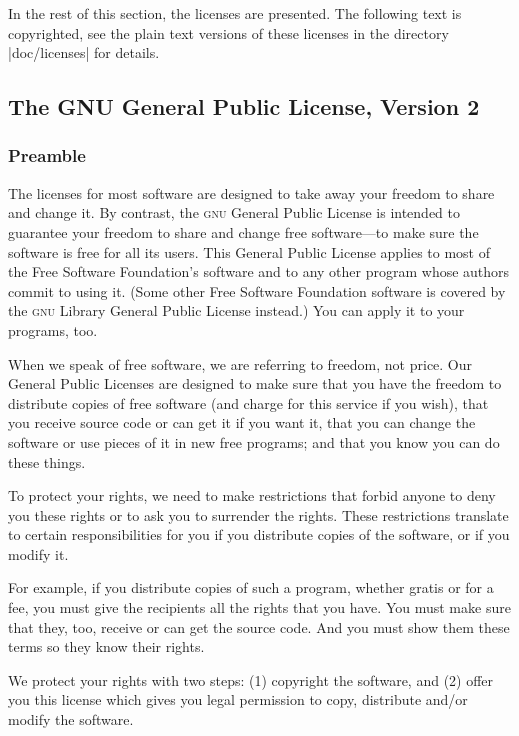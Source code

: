In the rest of this section, the licenses are presented. The following text is copyrighted, see the plain text versions of these licenses in the directory |doc/licenses| for details.


\subsection{The GNU General Public License, Version 2}

\subsubsection{Preamble}

The licenses for most software are designed to take away your freedom to share and change it. By contrast, the \textsc{gnu} General Public License is intended to guarantee your freedom to share and change free software---to make sure the software is free for all its users. This General Public License applies to most of the Free Software Foundation's software and to any other program whose authors commit to using it. (Some other Free Software Foundation software is covered by the \textsc{gnu} Library General Public License instead.) You can apply it to your programs, too.

When we speak of free software, we are referring to freedom, not price. Our General Public Licenses are designed to make sure that you have the freedom to distribute copies of free software (and charge for this service if you wish), that you receive source code or can get it if you want it, that you can change the software or use pieces of it in new free programs; and that you know you can do these things.

To protect your rights, we need to make restrictions that forbid anyone to deny you these rights or to ask you to surrender the rights. These restrictions translate to certain responsibilities for you if you distribute copies of the software, or if you modify it.

For example, if you distribute copies of such a program, whether gratis or for a fee, you must give the recipients all the rights that you have. You must make sure that they, too, receive or can get the source code. And you must show them these terms so they know their rights.

We protect your rights with two steps: (1) copyright the software, and (2) offer you this license which gives you legal permission to copy, distribute and/or modify the software.

